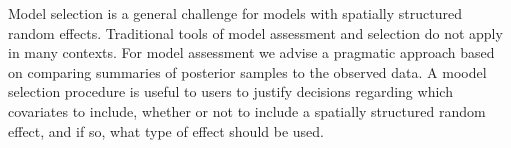 \documentclass[preprint,12pt]{elsarticle}
\begin{document}
Model selection is a general challenge for models with spatially structured random effects.  Traditional tools of model assessment and selection do not apply in many contexts.  For model assessment we advise a pragmatic approach based on comparing summaries of posterior samples to the observed data. A moodel selection procedure is useful to users to justify decisions regarding which covariates to include, whether or not to include a spatially structured random effect, and if so, what type of effect should be used. 



\end{document}
